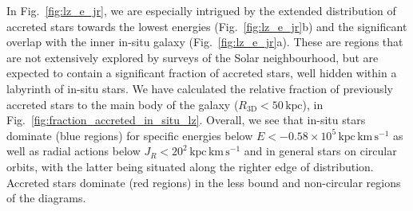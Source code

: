 \documentclass[fleqn,usenatbib]{mnras}
\begin{document}
In Fig.~\ref{fig:lz_e_jr}, we are especially intrigued by the extended distribution of accreted stars towards the lowest energies (Fig.~\ref{fig:lz_e_jr}b) and the significant overlap with the inner in-situ galaxy (Fig.~\ref{fig:lz_e_jr}a). These are regions that are not extensively explored by surveys of the Solar neighbourhood, but are expected to contain a significant fraction of accreted stars, well hidden within a labyrinth of in-situ stars. We have calculated the relative fraction of previously accreted stars to the main body of the galaxy ($R_\mathrm{3D} < 50\,\mathrm{kpc}$), in Fig.~\ref{fig:fraction_accreted_in_situ_lz}. Overall, we see that in-situ stars dominate (blue regions) for specific energies below $E < -0.58\times10^{5}\,\mathrm{kpc\,km\,s^{-1}}$ as well as radial actions below $J_R < 20^2\,\mathrm{kpc\,km\,s^{-1}}$ and in general stars on circular orbits, with the latter being situated along the righter edge of distribution. Accreted stars dominate (red regions) in the less bound and non-circular regions of the diagrams.
\end{document}
